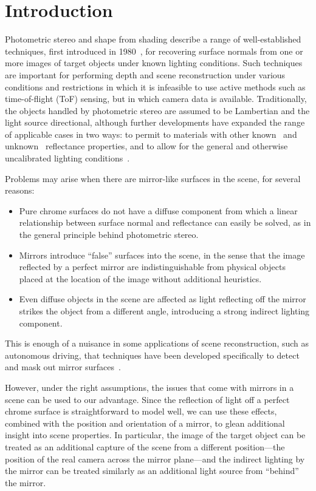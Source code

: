 \section{Introduction}\label{sec:introduction}
Photometric stereo and shape from shading describe a range of well-established techniques, first introduced in 1980~\cite{woodham}, for recovering surface normals from one or more images of target objects under known lighting conditions. Such techniques are important for performing depth and scene reconstruction under various conditions and restrictions in which it is infeasible to use active methods such as time-of-flight (ToF) sensing, but in which camera data is available. Traditionally, the objects handled by photometric stereo are assumed to be Lambertian and the light source directional, although further developments have expanded the range of applicable cases in two ways: to permit to materials with other known~\cite{defigueiredo} and unknown~\cite{hertzmann} reflectance properties, and to allow for the general and otherwise uncalibrated lighting conditions~\cite{basri}.

Problems may arise when there are mirror-like surfaces in the scene, for several reasons:
\begin{itemize}
  \item Pure chrome surfaces do not have a diffuse component from which a linear relationship between surface normal and reflectance can easily be solved, as in the general principle behind photometric stereo.
  \item Mirrors introduce ``false'' surfaces into the scene, in the sense that the image reflected by a perfect mirror are indistinguishable from physical objects placed at the location of the image without additional heuristics.
  \item Even diffuse objects in the scene are affected as light reflecting off the mirror strikes the object from a different angle, introducing a strong indirect lighting component.
\end{itemize}
This is enough of a nuisance in some applications of scene reconstruction, such as autonomous driving, that techniques have been developed specifically to detect and mask out mirror surfaces~\cite{yang}.

However, under the right assumptions, the issues that come with mirrors in a scene can be used to our advantage. Since the reflection of light off a perfect chrome surface is straightforward to model well, we can use these effects, combined with the position and orientation of a mirror, to glean additional insight into scene properties. In particular, the image of the target object can be treated as an additional capture of the scene from a different position---the position of the real camera across the mirror plane---and the indirect lighting by the mirror can be treated similarly as an additional light source from ``behind'' the mirror.

